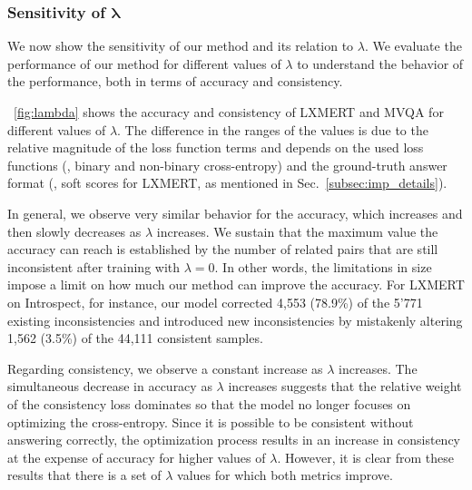 \subsubsection{Sensitivity of $\bm{\lambda}$}  We now show the sensitivity of our method and its relation to $\lambda$. We evaluate the performance of our method for different values of $\lambda$ to understand the behavior of the performance, both in terms of accuracy and consistency. 

\fig~\ref{fig:lambda} shows the accuracy and consistency of LXMERT and MVQA for different values of $\lambda$. The difference in the ranges of the values is due to the relative magnitude of the loss function terms and depends on the used loss functions (\eg, binary and non-binary cross-entropy) and the ground-truth answer format (\ie, soft scores for LXMERT, as mentioned in Sec.~\ref{subsec:imp_details}). 

In general, we observe very similar behavior for the accuracy, which increases and then slowly decreases as $\lambda$ increases. We sustain that the maximum value the accuracy can reach is established by the number of related pairs that are still inconsistent after training with $\lambda=0$. In other words, the limitations in size impose a limit on how much our method can improve the accuracy. For LXMERT on Introspect, for instance, our model corrected 4,553 (78.9\%) of the 5’771 existing inconsistencies and introduced new inconsistencies by mistakenly altering 1,562 (3.5\%) of the 44,111 consistent samples.

Regarding consistency, we observe a constant increase as $\lambda$ increases. The simultaneous decrease in accuracy as $\lambda$ increases suggests that the relative weight of the consistency loss dominates so that the model no longer focuses on optimizing the cross-entropy. Since it is possible to be consistent without answering correctly, the optimization process results in an increase in consistency at the expense of accuracy for higher values of $\lambda$. However, it is clear from these results that there is a set of $\lambda$ values for which both metrics improve.


 






